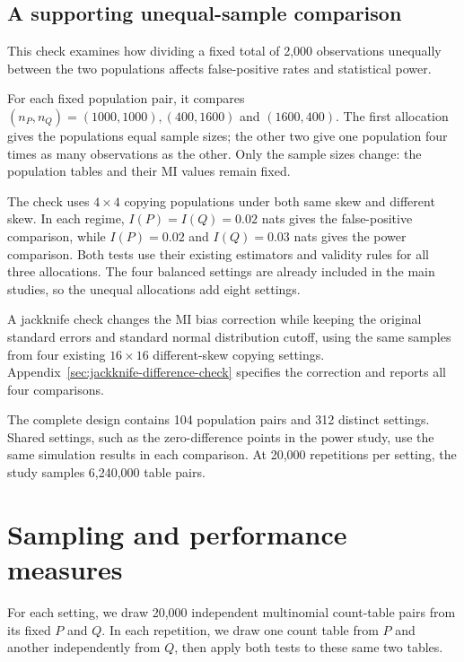 \subsection{A supporting unequal-sample comparison}

This check examines how dividing a fixed total of 2,000 observations
unequally between the two populations affects false-positive rates and
statistical power.

For each fixed population pair, it compares
\((n_P,n_Q)=(1000,1000),(400,1600)\) and \((1600,400)\).
The first allocation gives the populations equal sample sizes; the other
two give one population four times as many observations as the other.
Only the sample sizes change: the population tables and their MI values
remain fixed.

The check uses \(4\times4\) copying populations under both same skew and
different skew. In each regime, \(I(P)=I(Q)=0.02\) nats gives the
false-positive comparison, while \(I(P)=0.02\) and \(I(Q)=0.03\) nats
gives the power comparison. Both tests use their existing estimators and
validity rules for all three allocations. The four balanced settings are
already included in the main studies, so the unequal allocations add eight
settings.

\medskip
{}

A jackknife check changes the MI bias correction while keeping the
original standard errors and standard normal distribution cutoff,
using the same samples from four existing \(16\times16\) different-skew
copying settings. Appendix~\ref{sec:jackknife-difference-check}
specifies the correction and reports all four comparisons.

The complete design contains 104 population pairs and 312 distinct settings.
Shared settings, such as the zero-difference points in the power study,
use the same simulation results in each comparison. At 20,000 repetitions
per setting, the study samples 6,240,000 table pairs.

\section{Sampling and performance measures}

For each setting, we draw 20,000 independent multinomial count-table pairs
from its fixed \(P\) and \(Q\). In each repetition, we draw one count
table from \(P\) and another independently from \(Q\), then apply both
tests to these same two tables.

